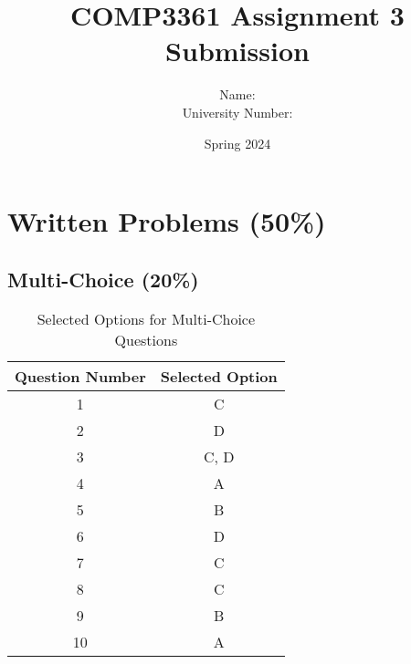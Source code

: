 \documentclass[10pt]{article}
\begin{document}
\title{COMP3361 Assignment 3 Submission}
\author{Name: \\ University Number:}
\date{Spring 2024}
\maketitle

\section{Written Problems (50\%)}

\subsection{Multi-Choice (20\%)}

\begin{table}[htbp]
\centering
\begin{tabular}{@{}cc@{}}
\toprule
Question Number & Selected Option \\ \midrule
1               &              C\\
2               &              D\\
3               &              C, D\\
4               &              A\\
5               &              B\\
6               &              D\\
7               &              C\\
8               &              C\\
9               &              B\\
10              &              A\\
\bottomrule
\end{tabular}
\caption{Selected Options for Multi-Choice Questions}
\label{tab:my_label}
\end{table}
\end{document}

